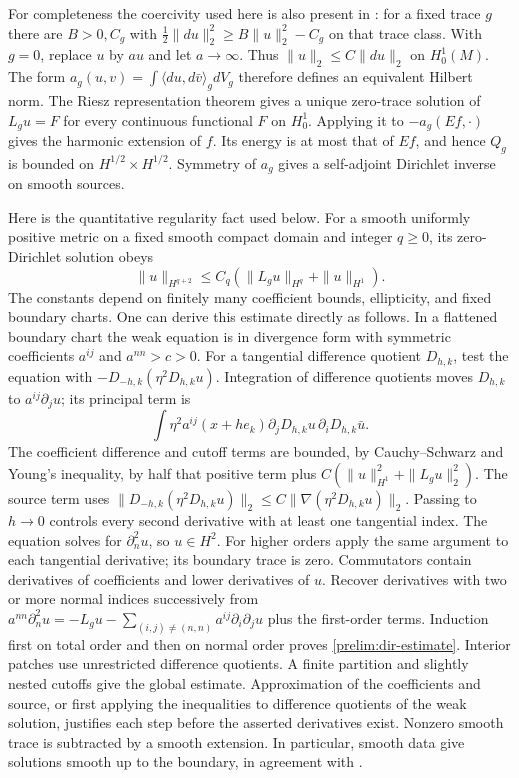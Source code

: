 For completeness the coercivity used here is also present in
\citep[Section~1, (1.16)]{TaylorElliptic}: for a fixed trace $g$ there
are $B>0,C_g$ with
$\frac12\|du\|_2^2\ge B\|u\|_2^2-C_g$ on that trace class.
With $g=0$, replace $u$ by $a u$ and let $a\to\infty$.
Thus $\|u\|_2\le C\|du\|_2$ on $H^1_0(M)$.
The form $a_g(u,v)=\int\langle du,d\bar v\rangle_gdV_g$
therefore defines an equivalent Hilbert norm. The Riesz representation
theorem \citep[Proposition~2.2]{TaylorFunctional} gives a unique zero-trace
solution of $L_gu=F$ for every continuous functional $F$ on $H^1_0$.
Applying it to $-a_g(Ef,\cdot)$ gives the harmonic extension of $f$.
Its energy is at most that of $Ef$, and hence $Q_g$ is bounded on
$H^{1/2}\times H^{1/2}$. Symmetry of $a_g$ gives a self-adjoint
Dirichlet inverse on smooth sources.

Here is the quantitative regularity fact used below. For a smooth
uniformly positive metric on a fixed smooth compact domain and
integer $q\ge0$, its zero-Dirichlet solution obeys
\begin{equation}\label{prelim:dir-estimate}
 \|u\|_{H^{q+2}}\le C_q(\|L_gu\|_{H^q}+\|u\|_{H^1}).
\end{equation}
The constants depend on finitely many coefficient bounds, ellipticity,
and fixed boundary charts. One can derive this estimate directly as
follows. In a flattened boundary chart the weak equation is in
divergence form with symmetric coefficients $a^{ij}$ and $a^{nn}>c>0$.
For a tangential difference quotient $D_{h,k}$, test the equation with
$-D_{-h,k}(\eta^2D_{h,k}u)$. Integration of difference quotients moves
$D_{h,k}$ to $a^{ij}\partial_j u$; its principal term is
\[
 \int\eta^2a^{ij}(x+he_k)
          \partial_jD_{h,k}u\,\partial_iD_{h,k}\bar u.
\]
The coefficient difference and cutoff terms are bounded, by Cauchy--Schwarz
and Young's inequality, by half that positive term plus
$C(\|u\|_{H^1}^2+\|L_gu\|_2^2)$. The source term uses
$\|D_{-h,k}(\eta^2D_{h,k}u)\|_2
 \le C\|\nabla(\eta^2D_{h,k}u)\|_2$.
Passing to $h\to0$ controls every second derivative with at least one
tangential index. The equation solves for $\partial_n^2u$, so $u\in H^2$.
For higher orders apply the same argument to each tangential derivative;
its boundary trace is zero. Commutators contain derivatives of coefficients
and lower derivatives of $u$. Recover derivatives with two or more normal
indices successively from
$a^{nn}\partial_n^2u=-L_gu-\sum_{(i,j)\ne(n,n)}a^{ij}\partial_i\partial_j u$
plus the first-order terms. Induction first on total order and then on
normal order proves \eqref{prelim:dir-estimate}. Interior patches use
unrestricted difference quotients. A finite partition and slightly nested
cutoffs give the global estimate. Approximation of the coefficients and
source, or first applying the inequalities to difference quotients of the
weak solution, justifies each step before the asserted derivatives exist.
Nonzero smooth trace is subtracted by a smooth extension. In particular,
smooth data give solutions smooth up to the boundary, in agreement with
\citep[Propositions~1.2--1.3]{TaylorElliptic}.

